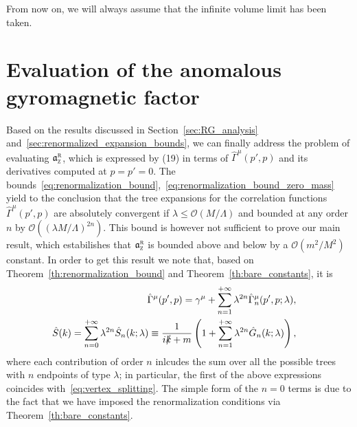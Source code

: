 \documentclass[a4paper, 11pt]{article}
\newcommand{\gyr}{\mathfrak{a}}								%
\newcommand{\rgyr}{\gyr_\textsc{z}^\textsc{r}}
\newcommand{\BigO}{\mathcal{O}}								%
\newcommand{\cutoff}{\Lambda}								%
\theoremstyle{thm}
\begin{document}
From now on, we will always assume that the infinite volume limit has been taken.

\section{Evaluation of the anomalous gyromagnetic factor}
\label{sec:g-2_calculation}

Based on the results discussed in Section~\ref{sec:RG_analysis} and~\ref{sec:renormalized_expansion_bounds}, we can finally address the problem of evaluating $\rgyr$, which is expressed by (19) in terms of 
$\hat{\Gamma}^\mu(p', p)$ and its derivatives computed at $p=p'=0$.
The bounds~\eqref{eq:renormalization_bound},~\eqref{eq:renormalization_bound_zero_mass} yield to the conclusion that the tree expansions for the correlation functions 
$\hat{\Gamma}^\mu(p', p)$ are absolutely convergent if $\lambda \le \BigO(M/\cutoff)$ and bounded at any order $n$ by $\BigO((\lambda M/\cutoff)^{2n})$.
This bound is however not sufficient to prove our main result, which estabilishes that $\rgyr$ is bounded above and below by a $\BigO(m^2/M^2)$ constant.
In order to get this result we note that, based on Theorem~\ref{th:renormalization_bound} and Theorem~\ref{th:bare_constants}, it is 
\begin{align}
\begin{split}
\label{eq:convergent_expansion_vertex}
\hat{\Gamma}^\mu(p', p) 
& = \gamma^\mu + \sum_{n = 1}^{+\infty} \lambda^{2n} \hat{\Gamma}^\mu_n(p', p; \lambda),
\end{split} \\
\begin{split}
\label{eq:convergent_expansion_S}
\hat{S}(k)
& = \sum_{n = 0}^{+\infty} \lambda^{2n} \hat{S}_n(k; \lambda) \equiv \frac{1}{i \slashed{k} + m} \left(1 + \sum_{n = 1}^{+\infty} \lambda^{2n} \hat{G}_n(k; \lambda) \right), 
\end{split}
\end{align}
where each contribution of order $n$ inlcudes the sum over all the possible trees with $n$ endpoints of type $\lambda$; in particular, the first of the above expressions coincides with~\eqref{eq:vertex_splitting}. The simple form of the $n = 0$ terms is due to the fact that we have imposed the renormalization conditions via Theorem~\ref{th:bare_constants}. 
\end{document}
